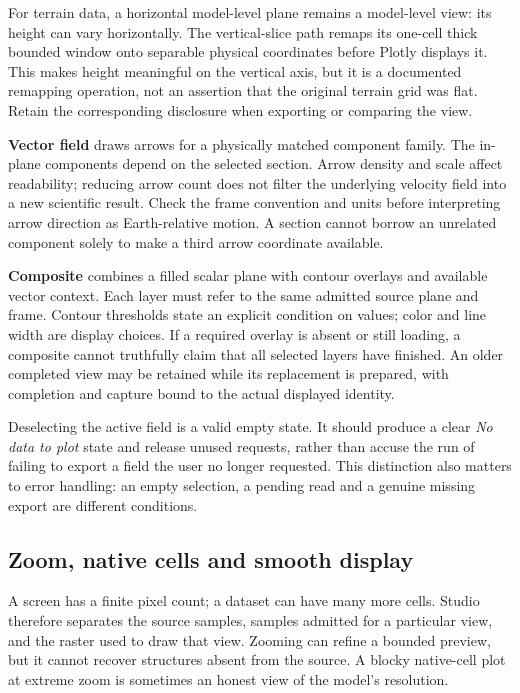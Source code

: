 For terrain data, a horizontal model-level plane remains a model-level view:
its height can vary horizontally. The vertical-slice path remaps its one-cell
thick bounded window onto separable physical coordinates before Plotly displays
it. This makes height meaningful on the vertical axis, but it is a documented
remapping operation, not an assertion that the original terrain grid was flat.
Retain the corresponding disclosure when exporting or comparing the view.

\textbf{Vector field} draws arrows for a physically matched component family.
The in-plane components depend on the selected section. Arrow density and scale
affect readability; reducing arrow count does not filter the underlying velocity
field into a new scientific result. Check the frame convention and units before
interpreting arrow direction as Earth-relative motion. A section cannot borrow
an unrelated component solely to make a third arrow coordinate available.

\textbf{Composite} combines a filled scalar plane with contour overlays and
available vector context. Each layer must refer to the same admitted source
plane and frame. Contour thresholds state an explicit condition on values; color
and line width are display choices. If a required overlay is absent or still
loading, a composite cannot truthfully claim that all selected layers have
finished. An older completed view may be retained while its replacement is
prepared, with completion and capture bound to the actual displayed identity.

Deselecting the active field is a valid empty state. It should produce a clear
\emph{No data to plot} state and release unused requests, rather than accuse the
run of failing to export a field the user no longer requested. This distinction
also matters to error handling: an empty selection, a pending read and a genuine
missing export are different conditions.

\subsection{Zoom, native cells and smooth display}
A screen has a finite pixel count; a dataset can have many more cells. Studio
therefore separates the source samples, samples admitted for a particular view,
and the raster used to draw that view. Zooming can refine a bounded preview, but
it cannot recover structures absent from the source. A blocky native-cell plot
at extreme zoom is sometimes an honest view of the model's resolution.

